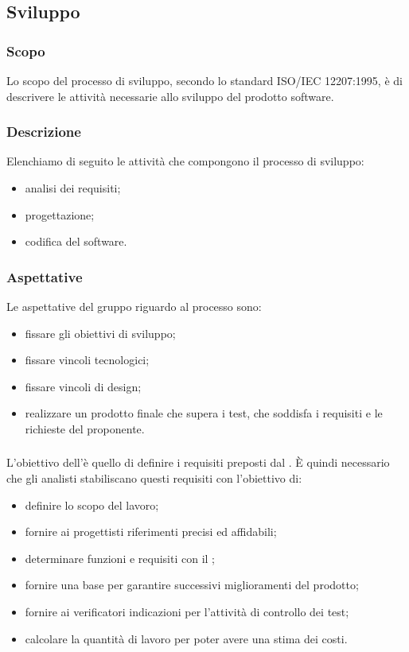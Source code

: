 \subsection{Sviluppo}
\subsubsection{Scopo}
Lo scopo del processo di sviluppo, secondo lo standard ISO/IEC 12207:1995, è di descrivere le attività necessarie allo sviluppo del prodotto software.

\subsubsection{Descrizione}
Elenchiamo di seguito le attività che compongono il processo di sviluppo:
\begin{itemize}
    \item analisi dei requisiti;
    \item progettazione;
    \item codifica del software.
\end{itemize}

\subsubsection{Aspettative}
Le aspettative del gruppo riguardo al processo sono:
\begin{itemize}
    \item fissare gli obiettivi di sviluppo;
    \item fissare vincoli tecnologici;
    \item fissare vincoli di design;
    \item realizzare un prodotto finale che supera i test, che soddisfa i requisiti e le richieste del proponente.
\end{itemize}

\subsubsection{\AdR{}}
L'obiettivo dell'\AdRv{}è quello di definire i requisiti preposti dal \proponProg{}. È quindi necessario che gli analisti stabiliscano questi requisiti con l'obiettivo di:
\begin{itemize}
    \item definire lo scopo del lavoro;
    \item fornire ai progettisti riferimenti precisi ed affidabili;
    \item determinare funzioni e requisiti con il \proponProg;
    \item fornire una base per garantire successivi miglioramenti del prodotto;
    \item fornire ai verificatori indicazioni per l'attività di controllo dei test;
    \item calcolare la quantità di lavoro per poter avere una stima dei costi.
\end{itemize}

